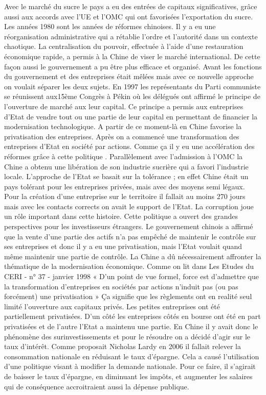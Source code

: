 Avec le marché du sucre le pays a eu des entrées de capitaux significatives, grâce aussi aux accords avec l’UE et l’OMC qui ont favorisées l’exportation du sucre.
Les années 1980 sont les années de réformes chinoises. Il y a eu une réorganisation administrative qui a rétablie l’ordre et l’autorité dans un contexte chaotique. La centralisation du pouvoir, effectuée à l’aide d’une restauration économique rapide, a permis à la Chine de viser le marché international. De cette façon aussi le gouvernement a pu être plus efficace et organisé.  
Avant les fonctions du gouvernement et des entreprises était mêlées mais avec ce nouvelle approche on voulait séparer les deux sujets. 
En 1997 les représentants du Parti communiste se réunissent aux15ème Congrès à Pékin où les délégués ont affirmé le principe de l’ouverture de marché aux leur capital. Ce principe a permis aux entreprises d’Etat de vendre tout ou une partie de leur capital en permettant de financier la modernisation technologique. A partir de ce moment-là en Chine favorise la privatisation des entreprises. Après on a commencé une transformation des entreprises d’Etat en société par actions. Comme ça il y eu une accélération des réformes grâce à cette politique .
Parallèlement avec l’admission à l’OMC la Chine a obtenu une libération de son industrie sucrière qui a favori l’industrie locale.
L’approche de l’Etat se basait sur la tolérance ; en effet Chine était un pays tolérant pour   les entreprises privées, mais avec des moyens semi légaux. Pour la création d’une entreprise sur le territoire il fallait   au moins 270 jours mais avec les contacts corrects on avait le support de l’Etat. La corruption joue un rôle important dans cette histoire.
Cette politique a ouvert des grandes perspectives pour les investisseurs étrangers. Le gouvernement chinois a affirmé que la vente d’une partie des actifs n’a pas empêché de maintenir le contrôle sur ses entreprises et donc il y a eu une privatisation, mais l’Etat voulait quand même maintenir une partie de contrôle.
La Chine a dû nécessairement affronter la thématique de la modernisation économique. Comme on lit dans Les Etudes du CERI - n° 37 - janvier 1998 « D'un point de vue formel, force est d'admettre que la transformation d'entreprises en sociétés par actions n'induit pas (ou pas forcément) une privatisation »  Ça signifie que les règlements ont en realité seul limité l’ouverture aux capitaux privés. Les petites entreprises ont été partiellement privatisées. D’un côté les entreprises côtés en bourse ont été en part privatisées et de l’autre l’Etat a maintenu une partie. 
En Chine il y avait donc le phénomène des surinvestissements et pour le résoudre on a décidé d’agir sur le taux d’intérêt. Comme proposait Nicholas Lardy en 2006 il fallait relever la consommation nationale en réduisant le taux d’épargne. Cela a causé l’utilisation d’une politique visant    à modifier la demande nationale.
Pour ce faire, il s’agirait de baisser le taux d’épargne, en diminuant les impôts, et augmenter les salaires qui de conséquence accroitraient aussi la dépense publique. 

